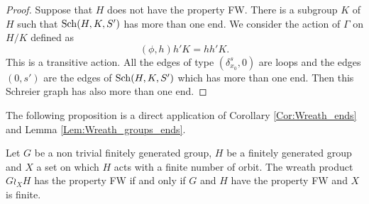 \begin{lem}
\begin{proof}
Suppose that $H$ does not have the property FW. There is a subgroup $K$ of $H$ such that $\operatorname{Sch}(H,K,S')$ has more than one end. We consider the action of $\Gamma$ on $H/K$ defined as
\begin{equation*}
 (\phi,h)h'K = hh'K.
\end{equation*}
This is a transitive action. All the edges of type $(\delta_{x_0}^s, 0)$ are loops and the edges $(0, s')$ are the edges of $\operatorname{Sch}(H,K,S')$ which has more than one end. Then this Schreier graph has also more than one end.
\end{proof}
\end{lem}
%
%
The following proposition is a direct application of Corollary \ref{Cor:Wreath_ends} and Lemma \ref{Lem:Wreath_groups_ends}.
\begin{prop}
Let $G$ be a non trivial finitely generated group, $H$ be a finitely generated group and $X$ a set on which $H$ acts with a finite number of orbit. The wreath product $G \wr_X H$ has the property FW if and only if $G$ and $H$ have the property FW and $X$ is finite.
\end{prop}
%